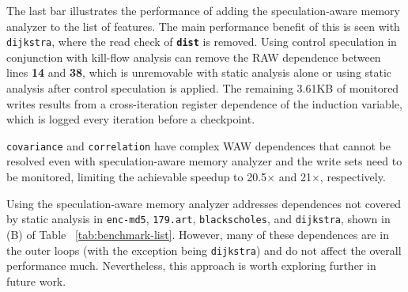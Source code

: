 The last bar illustrates the performance of adding the speculation-aware
memory analyzer to the list of features. The main performance benefit of
this is seen with \texttt{dijkstra}, where the read check of
\texttt{\textbf{dist}} is removed. Using control speculation in conjunction
with kill-flow analysis can remove the RAW dependence between lines
\textbf{14} and \textbf{38}, which is unremovable with static analysis
alone or using static analysis after control speculation is applied.
The remaining 3.61KB of monitored writes results from a cross-iteration
register dependence of the induction variable, which is logged every
iteration before a checkpoint.

\texttt{covariance} and \texttt{correlation} have complex WAW dependences
that cannot be resolved even with speculation-aware memory analyzer and
the write sets need to be monitored, limiting the achievable speedup to
20.5$\times$ and 21$\times$, respectively.



Using the speculation-aware memory analyzer addresses dependences not
covered by static analysis in
\texttt{enc-md5}, \texttt{179.art}, \texttt{blackscholes}, and
\texttt{dijkstra}, shown in (B) of Table ~\ref{tab:benchmark-list}. However,
many of these dependences are in the outer loops (with the exception
being \texttt{dijkstra}) and do not affect the overall performance much.
Nevertheless, this approach is worth exploring further in future work.




